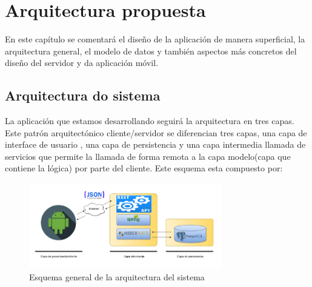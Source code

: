 \newpage
\section{Arquitectura propuesta}
\label{s:dev:arch}
 

En este capítulo se comentará el diseño de la aplicación de manera superficial, la arquitectura general, el
modelo de datos y también aspectos más concretos del diseño del servidor y da aplicación
móvil.



\subsection{Arquitectura do sistema}
La aplicación que estamos desarrollando seguirá la arquitectura
en tres capas. Este patrón arquitectónico cliente/servidor se diferencian tres
capas, una capa de interface de usuario , una capa de persistencia
y una capa intermedia llamada de servicios que permite la llamada de forma remota a la capa modelo(capa que contiene la lógica) por parte del cliente. Este esquema esta compuesto por:




\begin{figure}[H]
		\centering
		\includegraphics[width=0.75\textwidth] {arquitectura.png}
		\caption{Esquema general de la arquitectura del sistema }
	\end{figure}


